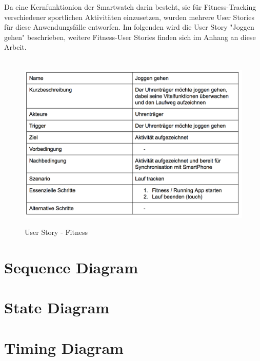 Da eine Kernfunktionion der Smartwatch darin besteht, sie für Fitness-Tracking verschiedener sportlichen Aktivitäten einzusetzen, wurden mehrere User Stories für diese Anwendungsfälle entworfen. Im folgenden wird die User Story "Joggen gehen" beschrieben, weitere Fitness-User Stories finden sich im Anhang an diese Arbeit.
\begin{figure}[H]
\centering\
\includegraphics[width=14cm]{img/story_joggen}
\caption{User Story - Fitness}\label{fig:story-joggen}
\end{figure}

\section{Sequence Diagram}

\section{State Diagram}

\section{Timing Diagram}

